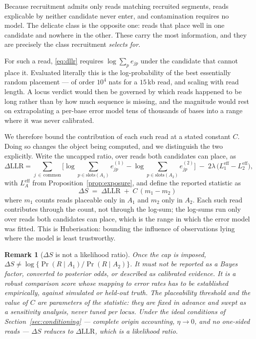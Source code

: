 \documentclass[11pt]{article}
\newtheorem{remark}{Remark}
\newcommand{\Prob}{\Pr}
\begin{document}
Because recruitment admits only reads matching recruited segments, reads
explicable by neither candidate never enter, and contamination requires no
model.  The delicate class is the opposite one: reads that place well in one
candidate and nowhere in the other.  These carry the most information, and they
are precisely the class recruitment \emph{selects for}.

For such a read, \eqref{eq:dllr} requires $\log\sum_p e_{jp}$ under the
candidate that cannot place it.  Evaluated literally this is the log-probability
of the best essentially random placement --- of order $10^4$ nats for a $15$\,kb
read, and scaling with read length.  A locus verdict would then be governed by
which reads happened to be long rather than by how much sequence is missing, and
the magnitude would rest on extrapolating a per-base error model tens of
thousands of bases into a range where it was never calibrated.

We therefore bound the contribution of each such read at a stated constant $C$.
Doing so changes the object being computed, and we distinguish the two
explicitly.  Write the uncapped ratio, over reads both candidates can place, as
\begin{equation}
    \Delta\mathrm{LLR}
    = \sum_{j\,\in\,\text{common}}\Bigg[
        \log\!\sum_{p\in\mathrm{slots}(A_1)}\! e^{(1)}_{jp}
      - \log\!\sum_{p\in\mathrm{slots}(A_2)}\! e^{(2)}_{jp}\Bigg]
      \;-\; 2\lambda\,\big(L_1^{\mathrm{eff}}-L_2^{\mathrm{eff}}\big),
\label{eq:llr-common}
\end{equation}
with $L_A^{\mathrm{eff}}$ from Proposition~\ref{prop:exposure}, and define the
reported statistic as
\begin{equation}
    \boxed{\;\Delta S \;=\; \Delta\mathrm{LLR} \;+\; C\,(m_1-m_2)\;}
\label{eq:final}
\end{equation}
where $m_1$ counts reads placeable only in $A_1$ and $m_2$ only in $A_2$.  Each
such read contributes through the count, not through the log-sum; the log-sums
run only over reads both candidates can place, which is the range in which the
error model was fitted.  This is Huberisation: bounding the influence of
observations lying where the model is least trustworthy.

\begin{remark}[$\Delta S$ is not a likelihood ratio]
\label{rem:not-lr}
Once the cap is imposed,
$\Delta S \neq \log\{\Prob(R\mid A_1)/\Prob(R\mid A_2)\}$.  It must not be
reported as a Bayes factor, converted to posterior odds, or described as
calibrated evidence.  It is a robust comparison score whose mapping to error
rates has to be established empirically, against simulated or held-out truth.
The placeability threshold and the value of $C$ are parameters of the
statistic: they are fixed in advance and swept as a sensitivity analysis, never
tuned per locus.  Under the ideal conditions of Section~\ref{sec:conditioning}
--- complete origin accounting, $\eta \to 0$, and no one-sided reads ---
$\Delta S$ reduces to $\Delta\mathrm{LLR}$, which is a likelihood ratio.
\end{remark}
\end{document}
